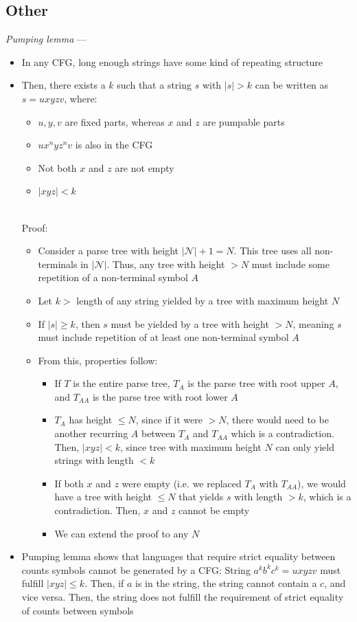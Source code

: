 \subsection*{Other}
\emph{Pumping lemma} ---
\begin{itemize}
    \item In any CFG, long enough strings have some kind of repeating structure
    \item Then, there exists a $k$ such that a string $s$ with $|s| > k$ can be written as $s = u x y z v$, where:
    \begin{itemize}
        \item $u, y, v$ are fixed parts, whereas $x$ and $z$ are pumpable parts
        \item $u x^n y z^n v$ is also in the CFG
        \item Not both $x$ and $z$ are not empty
        \item $|x y z| < k$
    \end{itemize}\\
    Proof:
    \begin{itemize}
        \item Consider a parse tree with height $|\mathcal{N}| + 1 = N$. This tree uses all non-terminals in $|\mathcal{N}|$. Thus, any tree with height $> N$ must include some repetition of a non-terminal symbol $A$
        \item Let $k >$ length of any string yielded by a tree with maximum height $N$
        \item If $|s| \geq k$, then $s$ must be yielded by a tree with height $> N$, meaning $s$ must include repetition of at least one non-terminal symbol $A$
        \item From this, properties follow:
        \begin{itemize}
            \item If $T$ is the entire parse tree, $T_A$ is the parse tree with root upper $A$, and $T_{AA}$ is the parse tree with root lower $A$
            \item $T_A$ has height $\leq N$, since if it were $> N$, there would need to be another recurring $A$ between $T_A$ and $T_{AA}$ which is a contradiction. Then, $|xyz| < k$, since tree with maximum height $N$ can only yield strings with length $<k$
            \item If both $x$ and $z$ were empty (i.e. we replaced $T_A$ with $T_{AA}$), we would have a tree with height $\leq N$ that yields $s$ with length $> k$, which is a contradiction. Then, $x$ and $z$ cannot be empty
            \item We can extend the proof to any $N$
        \end{itemize}
    \end{itemize}
    \item Pumping lemma shows that languages that require strict equality between counts symbols cannot be generated by a CFG: String $a^k b^k c^k = u x y z v$ must fulfill $| x y z | \leq k$. Then, if $a$ is in the string, the string cannot contain a $c$, and vice versa. Then, the string does not fulfill the requirement of strict equality of counts between symbols
\end{itemize}

